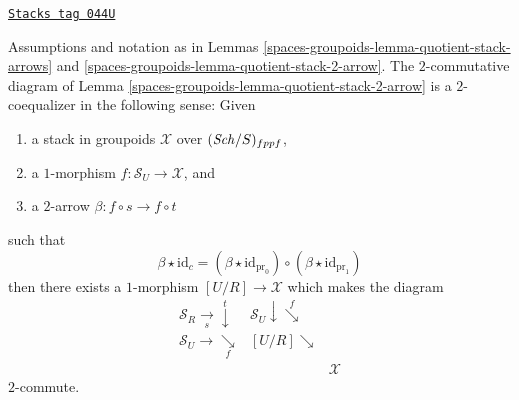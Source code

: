 \begin{lemma}
\label{spaces-groupoids-lemma-quotient-stack-2-coequalizer}
\href{https://stacks.math.columbia.edu/tag/044U}{\texttt{Stacks tag 044U}}

Assumptions and notation as in
Lemmas \ref{spaces-groupoids-lemma-quotient-stack-arrows} and
\ref{spaces-groupoids-lemma-quotient-stack-2-arrow}.
The $2$-commutative diagram of Lemma \ref{spaces-groupoids-lemma-quotient-stack-2-arrow}
is a $2$-coequalizer in the following sense:
Given
\begin{enumerate}
\item a stack in groupoids $\mathcal{X}$ over $(\mathit{Sch}/S)_{fppf}$,
\item a $1$-morphism $f : \mathcal{S}_U \to \mathcal{X}$, and
\item a $2$-arrow $\beta : f \circ s \to f \circ t$
\end{enumerate}
such that
$$
\beta \star \text{id}_c
=
(\beta \star \text{id}_{\text{pr}_0})
\circ
(\beta \star \text{id}_{\text{pr}_1})
$$
then there exists a $1$-morphism $[U/R] \to \mathcal{X}$ which makes the
diagram
$$
\begin{array}{ccc}\mathcal{S}_R \underset{s}{\longrightarrow}\overset{t}{\downarrow} & \mathcal{S}_U \downarrow\overset{f}{\searrow} &  \\ \mathcal{S}_U \longrightarrow\underset{f}{\searrow} & [U/R] \searrow &  \\  &  & \mathcal{X}\end{array}
$$
$2$-commute.
\end{lemma}

